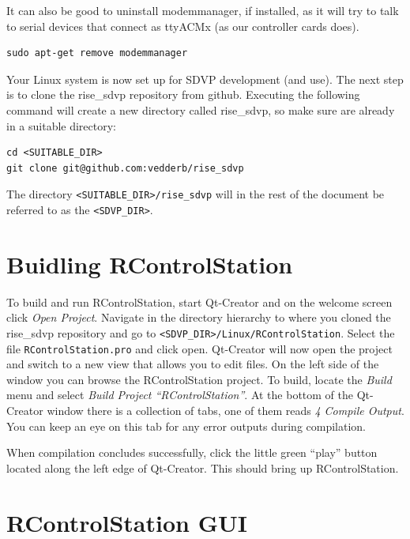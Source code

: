 \documentclass[12pt]{article} %
\begin{document}
It can also be good to uninstall modemmanager, if installed, as it
will try to talk to serial devices that connect as ttyACMx (as our
controller cards does).
\begin{Verbatim}
sudo apt-get remove modemmanager
\end{Verbatim}

Your Linux system is now set up for SDVP development (and use). The
next step is to clone the rise\_sdvp repository from github. Executing the
following command will create a new directory called rise\_sdvp, so make sure
are already in a suitable directory:
\begin{Verbatim}
cd <SUITABLE_DIR>   
git clone git@github.com:vedderb/rise_sdvp
\end{Verbatim}
The directory \texttt{<SUITABLE\_DIR>/rise\_sdvp} will in the rest of the document
be referred to as the \texttt{<SDVP\_DIR>}.


\section{Buidling RControlStation}

To build and run RControlStation, start Qt-Creator and on the welcome
screen click {\em Open Project}. Navigate in the directory hierarchy
to where you cloned the rise\_sdvp repository and go to
\texttt{<SDVP\_DIR>/Linux/RControlStation}. Select the file
\texttt{RControlStation.pro} and click open. Qt-Creator will now open
the project and switch to a new view that allows you to edit files.
On the left side of the window you can browse the RControlStation
project.  To build, locate the {\em Build} menu and select {\em Build
  Project ``RControlStation''}.  At the bottom of the Qt-Creator
window there is a collection of tabs, one of them reads {\em 4 Compile
  Output}. You can keep an eye on this tab for any error outputs
during compilation. 

When compilation concludes successfully, click the little green
``play'' button located along the left edge of Qt-Creator. This should
bring up RControlStation.

\section{RControlStation GUI}
\end{document}
